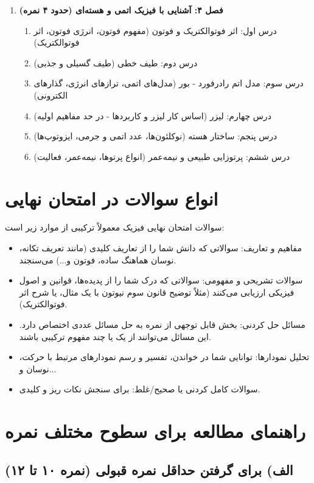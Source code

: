 \documentclass[12pt]{article}
\begin{document}
\begin{enumerate}
    \item \textbf{فصل ۴: آشنایی با فیزیک اتمی و هسته‌ای (حدود ۴ نمره)}
    \begin{enumerate}
        \item درس اول: اثر فوتوالکتریک و فوتون (مفهوم فوتون، انرژی فوتون، اثر فوتوالکتریک)
        \item درس دوم: طیف خطی (طیف گسیلی و جذبی)
        \item درس سوم: مدل اتم رادرفورد - بور (مدل‌های اتمی، ترازهای انرژی، گذارهای الکترونی)
        \item درس چهارم: لیزر (اساس کار لیزر و کاربردها - در حد مفاهیم اولیه)
        \item درس پنجم: ساختار هسته (نوکلئون‌ها، عدد اتمی و جرمی، ایزوتوپ‌ها)
        \item درس ششم: پرتوزایی طبیعی و نیمه‌عمر (انواع پرتوها، نیمه‌عمر، فعالیت)
    \end{enumerate}
\end{enumerate}

\section{انواع سوالات در امتحان نهایی}

سوالات امتحان نهایی فیزیک معمولاً ترکیبی از موارد زیر است:
\begin{itemize}
    \item مفاهیم و تعاریف: سوالاتی که دانش شما را از تعاریف کلیدی (مانند تعریف تکانه، نوسان هماهنگ ساده، فوتون و...) می‌سنجند.
    \item سوالات تشریحی و مفهومی: سوالاتی که درک شما را از پدیده‌ها، قوانین و اصول فیزیکی ارزیابی می‌کنند (مثلاً توضیح قانون سوم نیوتون با یک مثال، یا شرح اثر فوتوالکتریک).
    \item مسائل حل کردنی: بخش قابل توجهی از نمره به حل مسائل عددی اختصاص دارد. این مسائل می‌توانند از یک یا چند مفهوم ترکیبی باشند.
    \item تحلیل نمودارها: توانایی شما در خواندن، تفسیر و رسم نمودارهای مرتبط با حرکت، نوسان و...
    \item سوالات کامل کردنی یا صحیح/غلط: برای سنجش نکات ریز و کلیدی.
\end{itemize}

\section{راهنمای مطالعه برای سطوح مختلف نمره}

\subsection{الف) برای گرفتن حداقل نمره قبولی (نمره ۱۰ تا ۱۲)}
\end{document}
